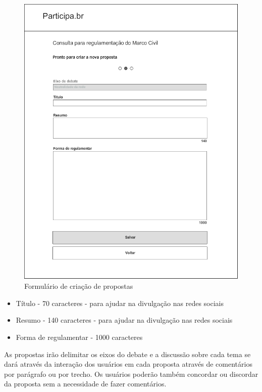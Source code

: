 \documentclass[12pt]{article}
\begin{document}
\begin{figure}[h]
\center
\includegraphics[scale=0.5]{04_-_proposta_passo_2.png}
\caption{Formulário de criação de propostas}
\label{fig:formulario-proposta}
\end{figure}

\begin{itemize}
  \item Título - 70 caracteres - para ajudar na divulgação nas redes sociais
  \item Resumo - 140 caracteres - para ajudar na divulgação nas redes sociais
  \item Forma de regulamentar - 1000 caracteres
\end{itemize}

As propostas irão delimitar os eixos do debate e a discussão sobre cada tema
se dará através da interação dos usuários em cada proposta através de
comentários por parágrafo ou por trecho. Os usuários poderão também concordar
ou discordar da proposta sem a necessidade de fazer comentários.
\end{document}
